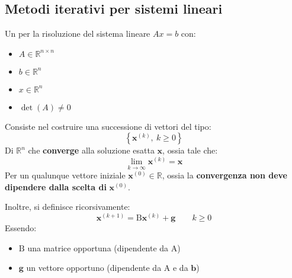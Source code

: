 \subsection{Metodi iterativi per sistemi lineari}

Un  per la risoluzione del sistema lineare $Ax = b$ con:
\begin{itemize}
    \item $A \in \mathbb{R}^{n \times n}$
    \item $b \in \mathbb{R}^{n}$
    \item $x \in \mathbb{R}^{n}$
    \item $\det\left(A\right) \ne 0$
\end{itemize}
Consiste nel costruire una successione di vettori del tipo:
\begin{equation*}
    \left\{\mathbf{x}^{\left(k\right)}, \: k \ge 0\right\}
\end{equation*}
Di $\mathbb{R}^{n}$ che \textbf{converge} alla soluzione esatta $\mathbf{x}$, ossia tale che:
\begin{equation}
    \displaystyle\lim_{k \rightarrow \infty} \mathbf{x}^{\left(k\right)} = \mathbf{x}
\end{equation}
Per un qualunque vettore iniziale $\mathbf{x}^{\left(0\right)} \in \mathbb{R}$, ossia la \textbf{convergenza non deve dipendere dalla scelta di} $\mathbf{x}^{\left(0\right)}$.

\highspace
Inoltre, si definisce ricorsivamente:
\begin{equation}\label{eq: metodi iterativi x con k + 1}
    \mathbf{x}^{\left(k+1\right)} = \mathrm{B}\mathbf{x}^{\left(k\right)} + \mathbf{g} \hspace{2em} k \ge 0
\end{equation}
Essendo:
\begin{itemize}
    \item $\mathrm{B}$ una matrice opportuna (dipendente da $\mathrm{A}$)
    \item $\mathbf{g}$ un vettore opportuno (dipendente da $\mathrm{A}$ e da $\mathbf{b}$)
\end{itemize}

